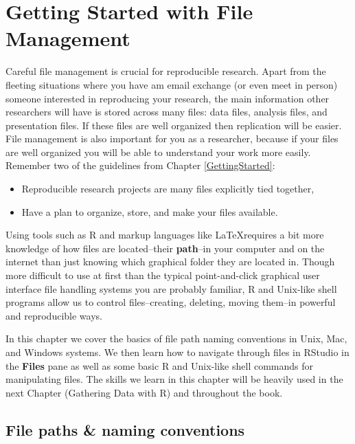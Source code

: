 \documentclass[ChapterTOCs,krantz1]{krantz}\usepackage{graphicx, color}
\begin{document}




\chapter{Getting Started with File Management}\label{DirectoriesChapter}

Careful file management is crucial for reproducible research. Apart from the fleeting situations where you have am email exchange (or even meet in person) someone interested in reproducing your research, the main information other researchers will have is stored across many files: data files, analysis files, and presentation files. If these files are well organized then replication will be easier. File management is also important for you as a researcher, because if your files are well organized you will be able to understand your work more easily. Remember two of the guidelines from Chapter \ref{GettingStarted}:

\begin{itemize}
    \item Reproducible research projects are many files explicitly tied together,
    \item Have a plan to organize, store, and make your files available. 
\end{itemize}

Using tools such as R and markup languages like \LaTeX requires a bit more knowledge of how files are located--their {\bf{path}}--in your computer and on the internet than just knowing which graphical folder they are located in. Though more difficult to use at first than the typical point-and-click graphical user interface file handling systems you are probably familiar, R and Unix-like shell programs allow us to control files--creating, deleting, moving them--in powerful and reproducible ways. 

In this chapter we cover the basics of file path naming conventions in Unix, Mac, and Windows systems. We then learn how to navigate through files in RStudio in the {\bf{Files}} pane as well as some basic R and Unix-like shell commands for manipulating files. The skills we learn in this chapter will be heavily used in the next Chapter (Gathering Data with R) and throughout the book.

\section{File paths \& naming conventions}
\end{document}
